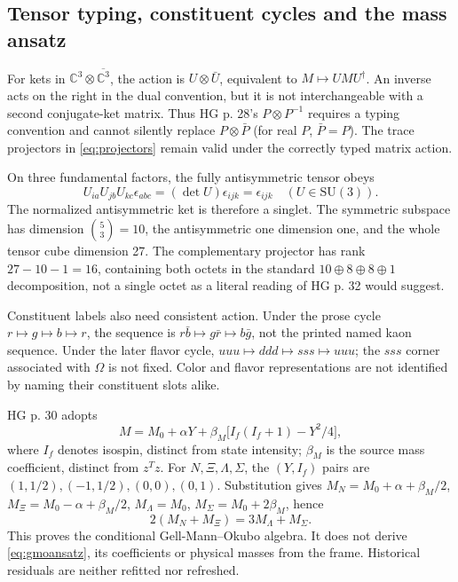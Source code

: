 \documentclass[11pt,a4paper]{article}
\numberwithin{equation}{section}
\newcommand{\C}{\mathbb C}\newcommand{\R}{\mathbb R}
\begin{document}
\subsection{Tensor typing, constituent cycles and the mass ansatz}
For kets in $\C^3\otimes\overline{\C^3}$, the action is $U\otimes\bar U$, equivalent to $M\mapsto UMU^\dagger$. An inverse acts on the right in the dual convention, but it is not interchangeable with a second conjugate-ket matrix. Thus HG p. 28's $P\otimes P^{-1}$ requires a typing convention and cannot silently replace $P\otimes\bar P$ (for real $P$, $\bar P=P$). The trace projectors in \eqref{eq:projectors} remain valid under the correctly typed matrix action.

On three fundamental factors, the fully antisymmetric tensor obeys
\begin{equation}
 U_{ia}U_{jb}U_{kc}\epsilon_{abc}=(\det U)\epsilon_{ijk}=\epsilon_{ijk}
 \quad(U\in\mathrm{SU}(3)).
\end{equation}
The normalized antisymmetric ket is therefore a singlet. The symmetric subspace has dimension $\binom{5}{3}=10$, the antisymmetric one dimension one, and the whole tensor cube dimension 27. The complementary projector has rank $27-10-1=16$, containing both octets in the standard $10\oplus8\oplus8\oplus1$ decomposition, not a single octet as a literal reading of HG p. 32 would suggest.

Constituent labels also need consistent action. Under the prose cycle $r\mapsto g\mapsto b\mapsto r$, the sequence is $r\bar b\mapsto g\bar r\mapsto b\bar g$, not the printed named kaon sequence. Under the later flavor cycle, $uuu\mapsto ddd\mapsto sss\mapsto uuu$; the $sss$ corner associated with $\Omega$ is not fixed. Color and flavor representations are not identified by naming their constituent slots alike.

HG p. 30 adopts
\begin{equation}\label{eq:gmoansatz}
 M=M_0+\alpha Y+\beta_M\bigl[I_f(I_f+1)-Y^2/4\bigr],
\end{equation}
where $I_f$ denotes isospin, distinct from state intensity; $\beta_M$ is the source mass coefficient, distinct from $z^Tz$. For $N,\Xi,\Lambda,\Sigma$, the $(Y,I_f)$ pairs are $(1,1/2),(-1,1/2),(0,0),(0,1)$. Substitution gives $M_N=M_0+\alpha+\beta_M/2$, $M_\Xi=M_0-\alpha+\beta_M/2$, $M_\Lambda=M_0$, $M_\Sigma=M_0+2\beta_M$, hence
\begin{equation}\label{eq:gmo}
 2(M_N+M_\Xi)=3M_\Lambda+M_\Sigma.
\end{equation}
This proves the conditional Gell-Mann--Okubo algebra. It does not derive \eqref{eq:gmoansatz}, its coefficients or physical masses from the frame. Historical residuals are neither refitted nor refreshed.
\end{document}
